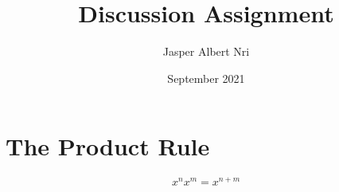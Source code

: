 \documentclass{article}
\title{Discussion Assignment}
\author{Jasper Albert Nri}
\date{September 2021}
\begin{document}
\maketitle

\section{The Product Rule}
$${x^nx^m = x^{n+m}}$$
\end{document}
